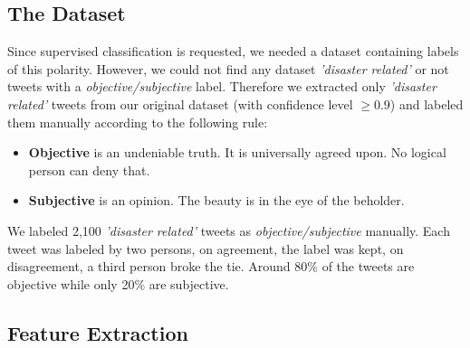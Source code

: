 \documentclass[letterpaper,twocolumn,10pt]{article}
\begin{document}
\subsection{The Dataset}
Since supervised classification is requested, we needed a dataset containing labels of this polarity. However, we could not find any dataset \textit{'disaster related'} or not tweets with a \textit{objective/subjective} label. Therefore we extracted only \textit{'disaster related'} tweets from our original dataset (with confidence level $ \ge 0.9 $) and labeled them manually according to the following rule:
\begin{itemize}
	\item \textbf{Objective} is an undeniable truth. It is universally agreed upon. No logical person can deny that.
	\item \textbf{Subjective} is an opinion. The beauty is in the eye of the beholder.
\end{itemize}
We labeled 2,100 \textit{'disaster related'} tweets as \textit{objective/subjective} manually. Each tweet was labeled by two persons, on agreement, the label was kept, on disagreement, a third person broke the tie. Around 80\% of the tweets are objective while only 20\% are subjective.

\subsection{Feature Extraction}
\end{document}
